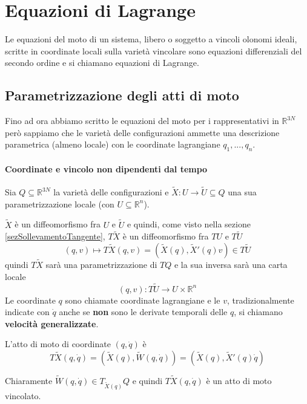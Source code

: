 \documentclass[11pt,a4paper,twoside]{book}
\theoremstyle{esss}
\theoremstyle{dotless}
\numberwithin{equation}{section} %
\begin{document}
\section{Equazioni di Lagrange} \label{sezLagrange}

Le equazioni del moto di un sistema, libero o soggetto a vincoli olonomi ideali, scritte in coordinate locali sulla varietà vincolare sono equazioni differenziali del secondo ordine e si chiamano equazioni di Lagrange.

\subsection{Parametrizzazione degli atti di moto}

Fino ad ora abbiamo scritto le equazioni del moto per i rappresentativi in $\mathbb{R}^{3N}$ però sappiamo che le varietà delle configurazioni ammette una descrizione parametrica (almeno locale) con le coordinate lagrangiane $q_1,...,q_n$.


\paragraph{Coordinate e vincolo non dipendenti dal tempo}
Sia $Q\subseteq\mathbb{R}^{3N}$ la varietà delle configurazioni e $\tilde{X}:U\rightarrow \tilde{U}\subseteq Q$ una sua parametrizzazione locale (con $U\subseteq\mathbb{R}^n$).

$\tilde{X}$ è un diffeomorfismo fra $U$ e $\tilde{U}$ e quindi, come visto nella sezione \ref{sezSollevamentoTangente}, $T\tilde{X}$ è un diffeomorfismo fra $TU$ e $T\tilde{U}$
\[
(q,v)\mapsto T\tilde{X}(q,v)=(\tilde{X}(q),\tilde{X}'(q) v)\in T\tilde{U}
\]
quindi $T\tilde{X}$ sarà una parametrizzazione di $TQ$ e la sua inversa sarà una carta locale
\[
(q,v):T\tilde{U}\rightarrow U\times\mathbb{R}^n
\]
Le coordinate $q$ sono chiamate coordinate lagrangiane e le $v$, tradizionalmente indicate con $\dot{q}$ anche se \textbf{non} sono le derivate temporali delle $q$, si chiamano \textbf{velocità generalizzate}.

L'atto di moto di coordinate $(q,\dot{q})$ è
\begin{equation}
T\tilde{X}(q,\dot{q}) = \left( \tilde{X}(q), \tilde{W}(q,\dot{q}) \right) = \left( \tilde{X}(q) , \tilde{X}'(q)\dot{q}\right)
\end{equation}

Chiaramente $\tilde{W}(q,\dot{q})\in T_{\tilde{X}(q)} Q$ e quindi $T\tilde{X}(q,\dot{q})$ è un atto di moto vincolato.
\end{document}
